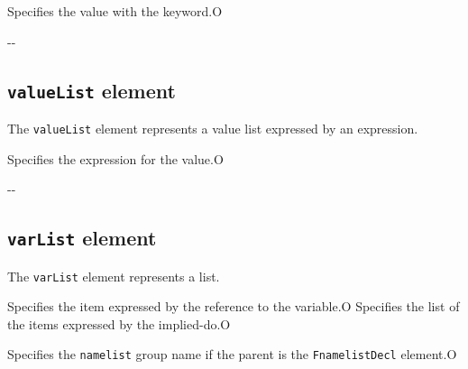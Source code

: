 \begin{XcodeMLChildElements}
{Specifies the value with the keyword.}{O}
\end{XcodeMLChildElements}

\begin{XcodeMLAttributes}
\XcodeMLAttrDef{-}{-}
{-}{-}
\end{XcodeMLAttributes}


\subsection{ {\tt valueList} element}

The {\tt valueList} element represents a value list expressed by an expression.


\begin{XcodeMLChildElements}
{Specifies the expression for the value.}{O}
\end{XcodeMLChildElements}

\begin{XcodeMLAttributes}
\XcodeMLAttrDef{-}{-}
{-}{-}
\end{XcodeMLAttributes}


\subsection{ {\tt varList} element}

The {\tt varList} element represents a list.


\begin{XcodeMLChildElements}
{Specifies the item expressed by the reference to the variable.}{O}
{Specifies the list of the items expressed by the implied-do.}{O}
\end{XcodeMLChildElements}

\begin{XcodeMLAttributes}
{Specifies the {\tt namelist} group name if the parent is the {\tt FnamelistDecl} element.}{O}
\end{XcodeMLAttributes}


